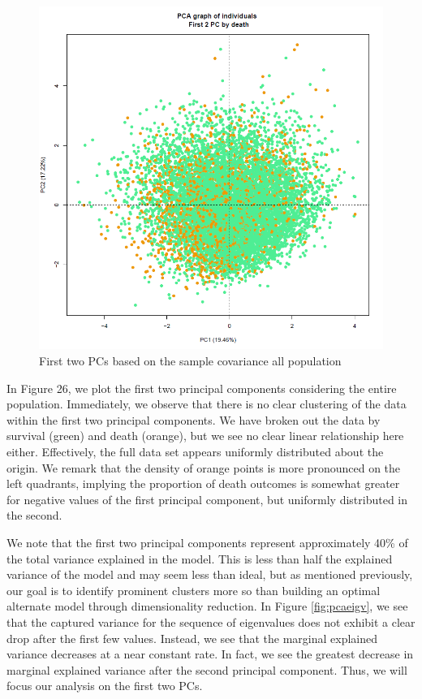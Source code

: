 \documentclass[
]{article}
\begin{document}
\begin{figure}
\centering
\includegraphics{../figure_output/pca_death.png}
\caption{First two PCs based on the sample covariance all population}
\end{figure}

In Figure 26, we plot the first two principal components considering the
entire population. Immediately, we observe that there is no clear
clustering of the data within the first two principal components. We
have broken out the data by survival (green) and death (orange), but we
see no clear linear relationship here either. Effectively, the full data
set appears uniformly distributed about the origin. We remark that the
density of orange points is more pronounced on the left quadrants,
implying the proportion of death outcomes is somewhat greater for
negative values of the first principal component, but uniformly
distributed in the second.

We note that the first two principal components represent approximately
40\% of the total variance explained in the model. This is less than
half the explained variance of the model and may seem less than ideal,
but as mentioned previously, our goal is to identify prominent clusters
more so than building an optimal alternate model through dimensionality
reduction. In Figure \ref{fig:pcaeigv}, we see that the captured
variance for the sequence of eigenvalues does not exhibit a clear drop
after the first few values. Instead, we see that the marginal explained
variance decreases at a near constant rate. In fact, we see the greatest
decrease in marginal explained variance after the second principal
component. Thus, we will focus our analysis on the first two PCs.
\end{document}
